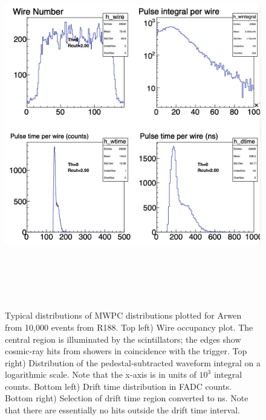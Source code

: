 \documentclass[12pt]{article}
\begin{document}
\begin{figure}[tbph]
\begin{center}
\includegraphics[height=16cm,clip=true]{MWPC_distributions}
\caption{Typical distributions of MWPC distributions plotted for Arwen from 10,000 events from R188. Top left) Wire occupancy plot. The central region is illuminated by the scintillators; the edges show cosmic-ray hits from showers in coincidence with the trigger. Top right) Distribution of the pedestal-subtracted waveform integral on a logarithmic scale. Note that the x-axis is in units of $10^3$ integral counts. Bottom left) Drift time distribution in FADC counts. Bottom right) Selection of drift time region converted to ns. Note that there are essentially no hits outside the drift time interval.
\label{fig:MWPC_distributions}}
\end{center}
\end{figure} 
\end{document}
